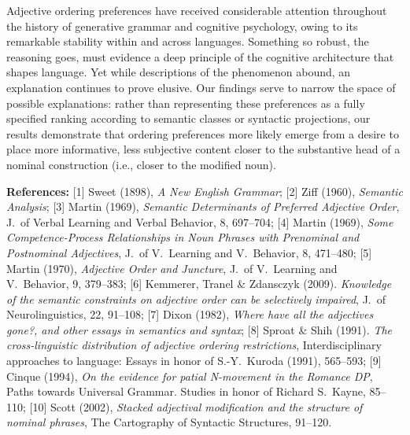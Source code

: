 \documentclass[12pt]{article}
\begin{document}
Adjective ordering preferences have received considerable attention throughout the history of generative grammar and cognitive psychology, owing to its remarkable stability within and across languages. Something so robust, the reasoning goes, must evidence a deep principle of the cognitive architecture that shapes language. Yet while descriptions of the phenomenon abound, an explanation continues to prove elusive. Our findings serve to narrow the space of possible explanations: rather than representing these preferences as a fully specified ranking according to semantic classes or syntactic projections, our results demonstrate that ordering preferences more likely emerge from a desire to place more informative, less subjective content closer to the substantive head of a nominal construction (i.e., closer to the modified noun).

\noindent
\footnotesize
	\textbf{References:} 
	[1]  Sweet (1898), {\em A New English Grammar};
	[2]  Ziff (1960), {\em Semantic Analysis};
	[3]  Martin (1969), {\em Semantic Determinants of Preferred Adjective Order}, J.~of Verbal Learning and Verbal Behavior, 8, 697--704;
	[4]  Martin (1969), {\em Some Competence-Process Relationships in Noun Phrases with Prenominal and Postnominal Adjectives}, J.~of V.~Learning and V.~Behavior, 8, 471--480;
	[5]  Martin (1970), {\em Adjective Order and Juncture}, J.~of V.~Learning and V.~Behavior, 9, 379--383;
	[6] Kemmerer, Tranel \& Zdansczyk (2009). {\em Knowledge of the semantic constraints on adjective order can be selectively impaired}, J.~of Neurolinguistics, 22, 91--108;
	[7]  Dixon (1982), {\em Where have all the adjectives gone?, and other essays in semantics and syntax};
	[8]  Sproat \& Shih (1991). {\em The cross-linguistic distribution of adjective ordering restrictions}, Interdisciplinary approaches to language: Essays in honor of S.-Y.~Kuroda (1991), 565--593;
	[9]  Cinque (1994), {\em On the evidence for patial N-movement in the Romance DP}, Paths towards Universal Grammar. Studies in honor of Richard S.~Kayne, 85--110;
	[10]  Scott (2002), {\em Stacked adjectival modification and the structure of nominal phrases}, The Cartography of Syntactic Structures, 91--120.
	
	
\newpage
\end{document}
